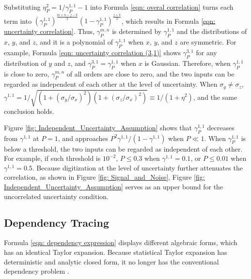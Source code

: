 \documentclass[twoside]{article}
\numberwithin{equation}{section}
\begin{document}
Substituting $\eta_P^2 = 1/\gamma_P^{1,1} - 1$ into Formula \eqref{eqn: overal correlation} turns each term into $(\gamma_P^{1,1})^{\frac{m+n-j-k}{2}} (1 - \gamma_P^{1,1})^{\frac{j+k}{2}}$, which results in Formula \eqref{eqn: uncertainty correlation}.
Thus, $\gamma_P^{m,n}$ is determined by $\gamma_P^{1,1}$ and the distributions of $x$, $y$, and $z$, and it is a polynomial of $\gamma_P^{1,1}$ when $x$, $y$, and $z$ are symmetric.
For example, Formula \eqref{eqn: uncertainty correlation (3,1)} shows $\gamma_P^{3,1}$ for any distribution of $y$ and $z$, and $\gamma_P^{3,1} = \gamma_P^{1,1}$ when $x$ is Gaussian.
Therefore, when $\gamma_P^{1,1}$ is close to zero, $\gamma_P^{m,n}$ of all orders are close to zero, and the two inputs can be regarded as independent of each other at the level of uncertainty.
When $\sigma_y \neq \sigma_z$, $\gamma^{1,1} = 1/\sqrt{(1 + (\sigma_y/\sigma_x)^2)(1 + (\sigma_z/\sigma_x)^2)} \equiv 1/(1 + \eta^2)$, and the same conclusion holds.

Figure \ref{fig: Independent_Uncertainty_Assumption} shows that $\gamma_P^{1,1}$ decreases from $\gamma^{1,1}$ at $P = 1$, and approaches $P^2 \gamma^{1,1}/(1 - \gamma^{1,1})$ when $P \ll 1$.
When $\gamma_P^{1,1}$ is below a threshold, the two inputs can be regarded as independent of each other.
For example, if such threshold is $10^{-2}$, $P \leq 0.3$ when $\gamma^{1,1} = 0.1$, or $P \leq 0.01$ when $\gamma^{1,1} = 0.5$.
Because digitization at the level of uncertainty further attenuates the correlation, as shown in Figure \ref{fig: Signal_and_Noise}, Figure \ref{fig: Independent_Uncertainty_Assumption} serves as an upper bound for the uncorrelated uncertainty condition.












\subsection{Dependency Tracing}


Formula \eqref{eqn: dependency expression} displays different algebraic forms, which has an identical Taylor expansion.
Because statistical Taylor expansion has deterministic and analytic closed form, it no longer has the conventional dependency problem \cite{Precise_Numerical_Methods, Algorithms_Accuracy, Interval_Analysis, Interval_Analysis_Theory_Applications}.
\end{document}
